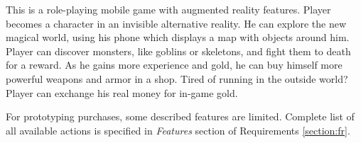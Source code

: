 This is a role-playing mobile game with augmented reality features. Player becomes a character in an invisible alternative reality. He can explore the new magical world, using his phone which displays a map with objects around him. Player can discover monsters, like goblins or skeletons, and fight them to death for a reward. As he gains more experience and gold, he can buy himself more powerful weapons and armor in a shop. Tired of running in the outside world? Player can exchange his real money for in-game gold.

For prototyping purchases, some described features are limited. Complete list of all available actions is specified in \textit{Features} section of Requirements \ref{section:fr}.